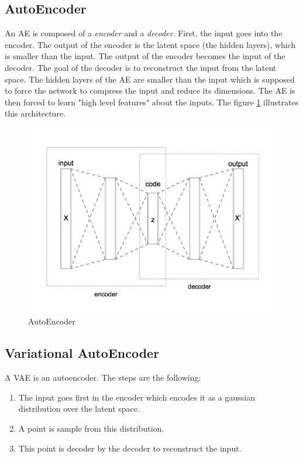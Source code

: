 \documentclass[12pt]{report}
\begin{document}
\subsection{AutoEncoder}

An AE is composed of a \textit{encoder} and a \textit{decoder}.
First, the input goes into the encoder. The output of the encoder is the latent space (the hidden layers), which is smaller than the input.
The output of the encoder becomes the input of the decoder. The goal of the decoder is to reconstruct the input from the latent space.
The hidden layers of the AE are smaller than the input which is supposed to force the network to compress the input and reduce its dimensions.
The AE is then forced to learn "high level features" about the inputs.
The figure \ref{fig:autoencoder} illustrates this architecture.

\begin{figure}[H]
    \centering
    \includegraphics[width=0.75 \textwidth]{images/nn/architectures/autoencoder.png}
    \caption{AutoEncoder}
    \label{fig:autoencoder}
\end{figure}

\subsection{Variational AutoEncoder}

A VAE is an autoencoder. The steps are the following:
\begin{enumerate}
    \item The input goes first in the encoder which encodes it as a gaussian distribution over the latent space.
    \item A point is sample from this distribution.
    \item This point is decoder by the decoder to reconstruct the input.
\end{enumerate}
\end{document}
